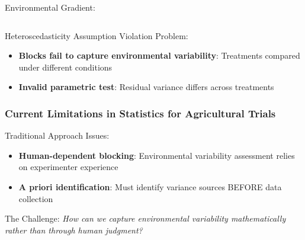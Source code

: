 \documentclass[aspectratio=43]{beamer}
\begin{document}
\begin{frame}
\begin{columns}
\begin{column}{0.3\textwidth}
\begin{block}{\small Environmental Gradient:}
            \end{block}
        \end{column}
    \end{columns}
    
    \begin{alertblock}{\small Heteroscedasticity Assumption Violation Problem:}
        \scriptsize
        \begin{itemize}
            \item \textbf{Blocks fail to capture environmental variability}: Treatments compared under different conditions
            \item \textbf{Invalid parametric test}: Residual variance differs across treatments
        \end{itemize}
    \end{alertblock}
\end{frame}

\begin{frame}
    \frametitle{\small Current Limitations in Statistics for Agricultural Trials}
    
    \begin{block}{Traditional Approach Issues:}
        \begin{itemize}
            \item \textbf{Human-dependent blocking}: Environmental variability assessment relies on experimenter experience
            \item \textbf{A priori identification}: Must identify variance sources BEFORE data collection
        \end{itemize}
    \end{block}
    
    \begin{alertblock}{The Challenge:}
        \textit{How can we capture environmental variability mathematically rather than through human judgment?}
    \end{alertblock}
\end{frame}
\end{document}
